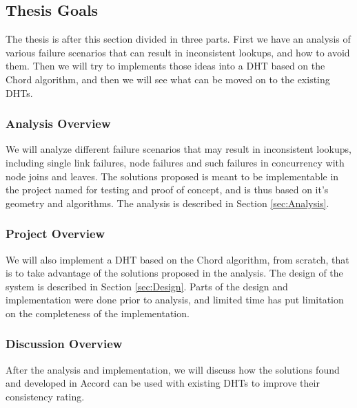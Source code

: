 \subsection{Thesis Goals}
\label{problem:Goals}

The thesis is after this section divided in three parts. First we have an analysis
 of various failure
 scenarios that can result in inconsistent lookups, and how to avoid them. Then we
 will try to implements those ideas into a DHT based on the Chord\cite{stoica-01-chord}
 algorithm, and then we will see what can be moved on to the existing DHTs.

\subsubsection{Analysis Overview}
\label{problem:Goal:Analysis}

We will analyze different failure scenarios that may result in inconsistent lookups,
 including single link failures, node failures and such failures in concurrency with
 node joins and leaves. The solutions proposed is meant to be implementable in the
 project named  for testing and proof of concept, and is thus based on
 it's geometry and algorithms. The analysis is
 described in Section \ref{sec:Analysis}.

\subsubsection{Project Overview}
\label{problem:Goal:Project}

We will also implement a DHT based on the Chord algorithm, from scratch, that is to
 take advantage of the solutions proposed in the analysis. The design of the system
 is described in Section \ref{sec:Design}. Parts
 of the design and implementation were done prior to analysis, and limited time has put
 limitation on the completeness of the implementation.

\subsubsection{Discussion Overview}
\label{problem:Goal:Discussion}

After the analysis and implementation, we will discuss how the solutions found and
 developed in Accord can be used with existing DHTs to improve their consistency rating.


